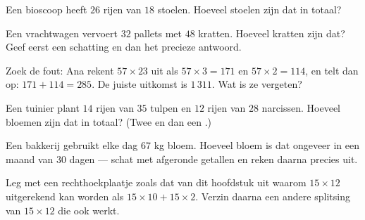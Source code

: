 \begin{exercise}[$\star$]\label{exo:g4:mult:6}
Een bioscoop heeft $26$ rijen van $18$ stoelen. Hoeveel stoelen zijn dat
in totaal?
\end{exercise}

\begin{exercise}[$\star$]\label{exo:g4:mult:7}
Een vrachtwagen vervoert $32$ pallets met $48$ kratten. Hoeveel kratten
zijn dat? Geef eerst een schatting en dan het precieze antwoord.
\end{exercise}

\begin{exercise}[$\star$]\label{exo:g4:mult:8}
Zoek de fout: Ana rekent $57 \times 23$ uit als $57 \times 3 = 171$ en
$57 \times 2 = 114$, en telt dan op: $171 + 114 = 285$. De juiste uitkomst
is $1\,311$. Wat is ze vergeten?
\end{exercise}

\begin{exercise}[$\star\star$]\label{exo:g4:mult:9}
Een tuinier plant $14$ rijen van $35$ tulpen en $12$ rijen van $28$
narcissen. Hoeveel bloemen zijn dat in totaal? (Twee  en dan een
.)
\end{exercise}

\begin{exercise}[$\star\star$]\label{exo:g4:mult:10}
Een bakkerij gebruikt elke dag $67$ kg bloem. Hoeveel bloem is dat
ongeveer in een maand van $30$ dagen --- schat met afgeronde getallen en
reken daarna precies uit.
\end{exercise}

\begin{exercise}[$\star\star$]\label{exo:g4:mult:11}
Leg met een rechthoekplaatje zoals dat van dit hoofdstuk uit waarom
$15 \times 12$ uitgerekend kan worden als $15 \times 10 + 15 \times 2$.
Verzin daarna een andere splitsing van $15 \times 12$ die ook werkt.
\end{exercise}
